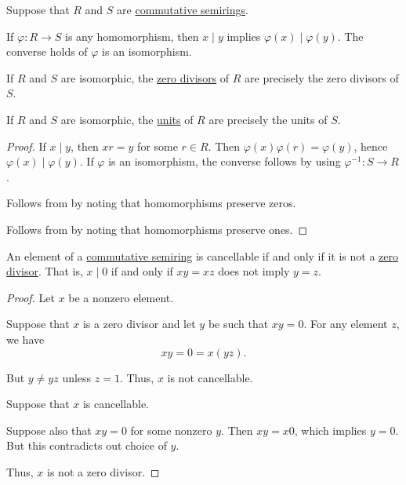 \begin{proposition}\label{thm:divisibility_and_isomorphisms}
  Suppose that \( R \) and \( S \) are \hyperref[def:semiring/commutative]{commutative semirings}.

  \begin{thmenum}
     If \( \varphi: R \to S \) is any homomorphism, then \( x \mid y \) implies \( \varphi(x) \mid \varphi(y) \). The converse holds of \( \varphi \) is an isomorphism.

     If \( R \) and \( S \) are isomorphic, the \hyperref[def:divisibility/zero]{zero divisors} of \( R \) are precisely the zero divisors of \( S \).

     If \( R \) and \( S \) are isomorphic, the \hyperref[def:divisibility/unit]{units} of \( R \) are precisely the units of \( S \).
  \end{thmenum}
\end{proposition}
\begin{proof}
   If \( x \mid y \), then \( xr = y \) for some \( r \in R \). Then \( \varphi(x) \varphi(r) = \varphi(y) \), hence \( \varphi(x) \mid \varphi(y) \). If \( \varphi \) is an isomorphism, the converse follows by using \( \varphi^{-1}: S \to R \).

   Follows from  by noting that homomorphisms preserve zeros.

   Follows from  by noting that homomorphisms preserve ones.
\end{proof}

\begin{proposition}\label{thm:semiring_cancellative_iff_no_zero_divisors}
  An element of a \hyperref[def:semiring/commutative]{commutative semiring} is cancellable if and only if it is not a \hyperref[def:divisibility]{zero divisor}. That is, \( x \mid 0 \) if and only if \( xy = xz \) does not imply \( y = z \).
\end{proposition}
\begin{proof}
  Let \( x \) be a nonzero element.

  \SufficiencySubProof Suppose that \( x \) is a zero divisor and let \( y \) be such that \( xy = 0 \). For any element \( z \), we have
  \begin{equation*}
    xy = 0 = x(yz).
  \end{equation*}

  But \( y \neq yz \) unless \( z = 1 \). Thus, \( x \) is not cancellable.

  \NecessitySubProof Suppose that \( x \) is cancellable.

  Suppose also that \( xy = 0 \) for some nonzero \( y \). Then \( xy = x0 \), which implies \( y = 0 \). But this contradicts out choice of \( y \).

  Thus, \( x \) is not a zero divisor.
\end{proof}

